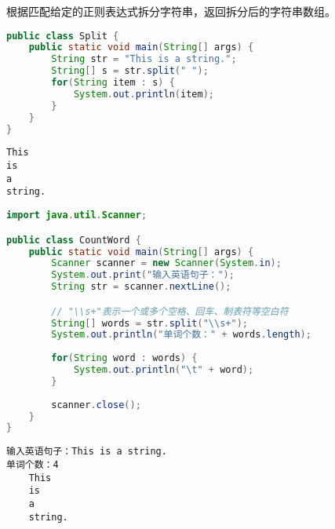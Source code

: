 根据匹配给定的正则表达式拆分字符串，返回拆分后的字符串数组。 \\


\begin{lstlisting}[language=Java]
public class Split {
	public static void main(String[] args) {
		String str = "This is a string.";
		String[] s = str.split(" ");
		for(String item : s) {
			System.out.println(item);
		}
	}
}
\end{lstlisting}

\begin{tcolorbox}
	\begin{verbatim}
This
is
a
string.
	\end{verbatim}
\end{tcolorbox}

\vspace{0.5cm}


\begin{lstlisting}[language=Java]
import java.util.Scanner;

public class CountWord {
	public static void main(String[] args) {
		Scanner scanner = new Scanner(System.in);
		System.out.print("输入英语句子：");
		String str = scanner.nextLine();

		// "\\s+"表示一个或多个空格、回车、制表符等空白符
		String[] words = str.split("\\s+");
		System.out.println("单词个数：" + words.length);
		
        for(String word : words) {
			System.out.println("\t" + word);
		}
        
		scanner.close();
	}
}
\end{lstlisting}

\begin{tcolorbox}
	\begin{verbatim}
输入英语句子：This is a string.
单词个数：4
    This
    is
    a
    string.
	\end{verbatim}
\end{tcolorbox}

\newpage